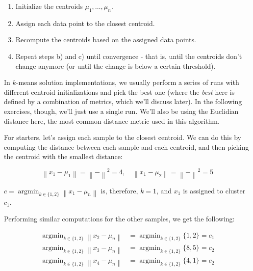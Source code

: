 \documentclass[12pt]{article}
\begin{document}
\begin{enumerate}[leftmargin=\labelsep]
  \begin{enumerate}
    \item Initialize the centroids $\mu_1, \ldots, \mu_n$.
    \item Assign each data point to the closest centroid.
    \item Recompute the centroids based on the assigned data points.
    \item Repeat steps b) and c) until convergence - that is, until the centroids don't change anymore
          (or until the change is below a certain threshold).
  \end{enumerate}

  In $k$-means solution implementations, we usually perform a series of runs with different
  centroid initializations and pick the best one (where the \textit{best} here
  is defined by a combination of metrics, which we'll discuss later). In the following
  exercises, though, we'll just use a single run. We'll also be using the Euclidian distance here,
  the most common distance metric used in this algorithm.

  For starters, let's assign each sample to the closest centroid. We can do this by computing
  the distance between each sample and each centroid, and then picking the centroid with the
  smallest distance:

  \begin{equation*}
    \left\| x_1 - \mu_1 \right\| = \left\|  -  \right\|^2 = 4, \quad
    \left\| x_1 - \mu_2 \right\| = \left\|  -  \right\|^2 = 5
  \end{equation*}

  $c = \operatorname{argmin}_{k \in \{1, 2\}} \left\| x_1 - \mu_n \right\|$ is, therefore, $k = 1$,
  and $x_1$ is assigned to cluster $c_1$.

  Performing similar computations for the other samples, we get the following:

  \begin{equation*}
    \begin{aligned}
      \operatorname{argmin}_{k \in \{1, 2\}} \left\| x_2 - \mu_n \right\| & = \operatorname{argmin}_{k \in \{1, 2\}} \{1, 2\} = c_1 \\
      \operatorname{argmin}_{k \in \{1, 2\}} \left\| x_3 - \mu_n \right\| & = \operatorname{argmin}_{k \in \{1, 2\}} \{8, 5\} = c_2 \\
      \operatorname{argmin}_{k \in \{1, 2\}} \left\| x_4 - \mu_n \right\| & = \operatorname{argmin}_{k \in \{1, 2\}} \{4, 1\} = c_2
    \end{aligned}
  \end{equation*}


\end{enumerate}
\end{document}
